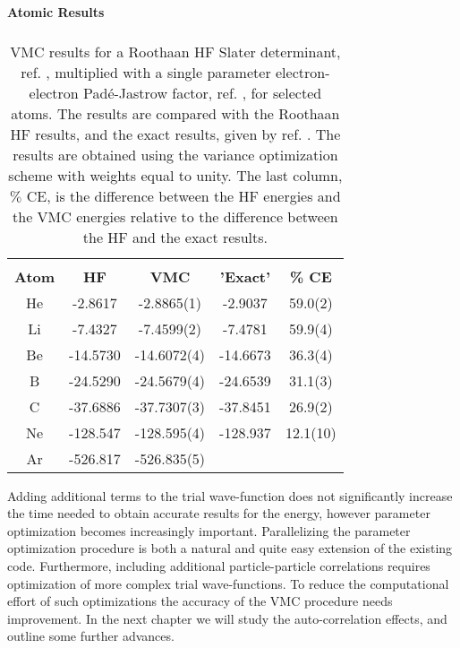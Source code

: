\begin{table}[hbtp]
\begin{center} {\large \bf Atomic Results} \\ 
$\phantom{a}$ \\
\begin{tabular}{ccccc}
\hline\\ 
{\bf Atom} & {\bf HF}     & {\bf VMC}   & {\bf 'Exact'} & {\bf \% CE} \\
He         &   -2.8617    &  -2.8865(1) &  -2.9037 & 59.0(2) \\   Li         &   -7.4327    &  -7.4599(2) &  -7.4781 & 59.9(4) \\   
Be         &  -14.5730    & -14.6072(4) & -14.6673 & 36.3(4) \\   
B          &  -24.5290    & -24.5679(4) & -24.6539 & 31.1(3) \\   
C          &  -37.6886    & -37.7307(3) & -37.8451 & 26.9(2) \\   
Ne         &  -128.547    & -128.595(4) & -128.937 & 12.1(10) \\   
Ar         &  -526.817    & -526.835(5) &  &  \\     [10pt]
\hline
\end{tabular} 
\end{center}
\caption{VMC results for a Roothaan HF Slater determinant,
  ref. \cite{clementi1974}, multiplied with a single parameter
  electron-electron Pad\'{e}-Jastrow factor, ref. \cite{hammond1994},
  for selected atoms. The results are compared with the Roothaan HF
  results, and the exact results, given by
  ref. \cite{hammond1994}. The results are obtained using the variance
  optimization scheme with weights equal to unity. The last column, 
  $\%$ CE, is the difference between the HF energies and the VMC
  energies relative to the difference between the HF and the exact
  results.}
\label{atomicResults}
\end{table}

Adding additional terms to the trial wave-function does not
significantly increase the time needed to obtain accurate results for
the energy, however parameter optimization becomes increasingly
important. Parallelizing the parameter optimization procedure
is both a natural and quite easy extension of the existing
code. Furthermore, including additional particle-particle correlations
requires optimization of more complex trial wave-functions. To reduce
the computational effort of such optimizations the accuracy of the VMC 
procedure needs improvement. In the next chapter we will study the
auto-correlation effects, and outline some further advances.


